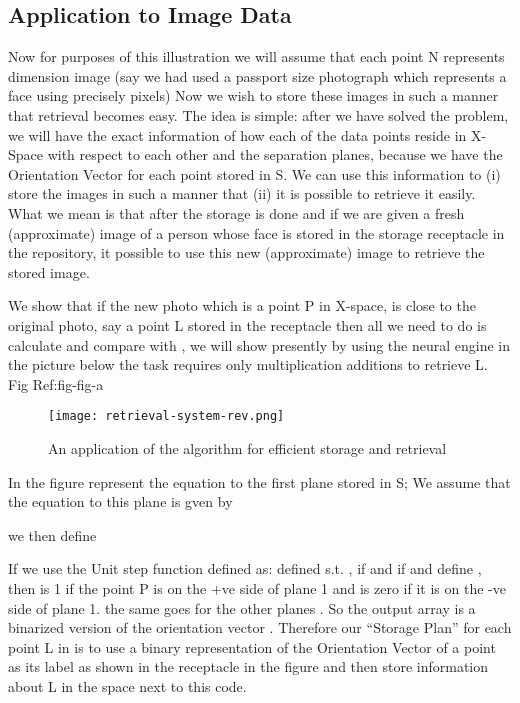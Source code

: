 \documentclass[english]{article}
\begin{document}
\subsection{Application to Image Data}

Now for purposes of this illustration we will assume that each point
N represents  dimension image (say we had used a passport size
photograph which represents a face using precisely  pixels) Now
we wish to store these images in such a manner that retrieval becomes
easy. The idea is simple: after we have solved the problem, we will
have the exact information of how each of the data points  reside
in X-Space with respect to each other and the separation planes, because
we have the Orientation Vector for each point stored in S. We can
use this information to (i) store the images in such a manner that
(ii) it is possible to retrieve it easily. What we mean is that after
the storage is done and if we are given a fresh (approximate) image
of a person whose face is stored in the storage receptacle in the
repository, it possible to use this new (approximate) image to retrieve
the stored image.

We show that if the new photo which is a point P in X-space, is close
to the original photo, say a point L stored in the receptacle then
all we need to do is calculate  and compare with 
, we will show presently by using the neural engine in the picture
below the task requires only  multiplication  additions
to retrieve L. Fig Ref:fig-fig-a 

\medskip{}
\begin{figure}[htp]
 \begin{center}
\texttt{[image: retrieval-system-rev.png]}
\caption{An application of the algorithm for efficient storage and retrieval}


\label{fig:fig-a} \end{center}
\end{figure} 


\medskip{}


In the figure  represent the equation to the first plane stored
in S; We assume that the equation to this plane is gven by 

 we then define 

 If we use the Unit step function defined as:  defined s.t.
, if  and  if  and define ,
then  is 1 if the point P is on the +ve side of plane 1 and
is zero if it is on the -ve side of plane 1. the same goes for the
other planes . So the output array 
is a binarized version of the orientation vector . Therefore
our {}``Storage Plan'' for each point L in is to use a binary representation
of the Orientation Vector  of a point  as its label as
shown in the receptacle in the figure and then store information about
L in the space next to this code.
\end{document}
